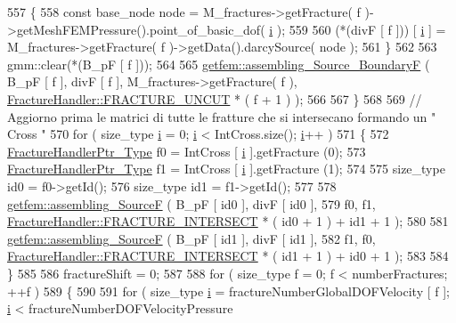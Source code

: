\begin{DoxyCode}
557         \{
558             \textcolor{keyword}{const} base\_node node = M\_fractures->getFracture( f )->getMeshFEMPressure().point\_of\_basic\_dof( 
      \hyperlink{matrici_8m_a6f6ccfcf58b31cb6412107d9d5281426}{i} );
559 
560             (*(divF [ f ])) [ \hyperlink{matrici_8m_a6f6ccfcf58b31cb6412107d9d5281426}{i} ] = M\_fractures->getFracture( f )->getData().darcySource( node );
561         \}
562 
563         gmm::clear(*(B\_pF [ f ]));
564 
565         \hyperlink{namespacegetfem_ac08fe08fb325eede94ffe4968b7980de}{getfem::assembling\_Source\_BoundaryF} ( B\_pF [ f ], divF [ f ], 
      M\_fractures->getFracture( f ), \hyperlink{classFractureHandler_a495ad4fc72d0c47c8f0424842f1153aaaa992cc3ad024a030ecd798dc319c95ac}{FractureHandler::FRACTURE\_UNCUT} * ( f + 1 ) );
566 
567     \}
568     
569     \textcolor{comment}{// Aggiorno prima le matrici di tutte le fratture che si intersecano formando un " Cross "}
570     \textcolor{keywordflow}{for} ( size\_type \hyperlink{matrici_8m_a6f6ccfcf58b31cb6412107d9d5281426}{i} = 0; \hyperlink{matrici_8m_a6f6ccfcf58b31cb6412107d9d5281426}{i} < IntCross.size(); \hyperlink{matrici_8m_a6f6ccfcf58b31cb6412107d9d5281426}{i}++ )
571     \{
572         \hyperlink{FractureHandler_8h_af23fb7a30aaff864bd42587af4f1e78a}{FractureHandlerPtr\_Type} f0 = IntCross [ \hyperlink{matrici_8m_a6f6ccfcf58b31cb6412107d9d5281426}{i} ].getFracture (0);
573         \hyperlink{FractureHandler_8h_af23fb7a30aaff864bd42587af4f1e78a}{FractureHandlerPtr\_Type} f1 = IntCross [ \hyperlink{matrici_8m_a6f6ccfcf58b31cb6412107d9d5281426}{i} ].getFracture (1);
574         
575         size\_type id0 = f0->getId();
576         size\_type id1 = f1->getId();
577 
578         \hyperlink{namespacegetfem_a5efeefe94dfb5427c3ecf63d0b342c57}{getfem::assembling\_SourceF} ( B\_pF [ id0 ], divF [ id0 ],
579                                     f0, f1, \hyperlink{classFractureHandler_a495ad4fc72d0c47c8f0424842f1153aaa781cae3f3b99bf9357fed2833d315537}{FractureHandler::FRACTURE\_INTERSECT}
       * ( id0 + 1 ) + id1 + 1 );
580                         
581         \hyperlink{namespacegetfem_a5efeefe94dfb5427c3ecf63d0b342c57}{getfem::assembling\_SourceF} ( B\_pF [ id1 ], divF [ id1 ],
582                                     f1, f0, \hyperlink{classFractureHandler_a495ad4fc72d0c47c8f0424842f1153aaa781cae3f3b99bf9357fed2833d315537}{FractureHandler::FRACTURE\_INTERSECT}
       * ( id1 + 1 ) + id0 + 1 );
583         
584     \}
585  
586     fractureShift = 0;
587     
588     \textcolor{keywordflow}{for} ( size\_type f = 0; f < numberFractures; ++f )
589     \{
590 
591         \textcolor{keywordflow}{for} ( size\_type \hyperlink{matrici_8m_a6f6ccfcf58b31cb6412107d9d5281426}{i} = fractureNumberGlobalDOFVelocity [ f ]; \hyperlink{matrici_8m_a6f6ccfcf58b31cb6412107d9d5281426}{i} < fractureNumberDOFVelocityPressure 

\end{DoxyCode}

